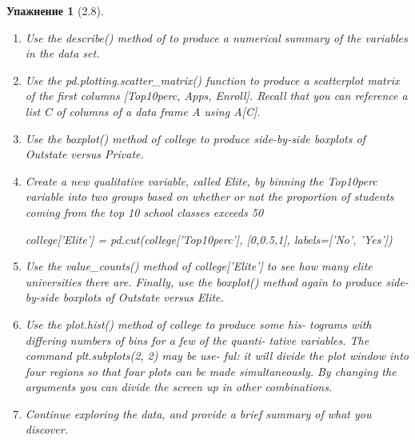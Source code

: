 \documentclass{article}
\newtheorem{exercise}[subsubsection]{Упажнение}
\begin{document}
\begin{exercise}[2.8]
\begin{enumerate}[label=(\alph*)]
		\item Use the describe() method of to produce a numerical summary
		of the variables in the data set.
		\item Use the pd.plotting.scatter\_matrix() function to produce a
		scatterplot matrix of the first columns [Top10perc, Apps, Enroll].
		Recall that you can reference a list C of columns of a data frame
		A using A[C].
		\item Use the boxplot() method of college to produce side-by-side
		boxplots of Outstate versus Private.
		\item Create a new qualitative variable, called Elite, by binning the
		Top10perc variable into two groups based on whether or not the
		proportion of students coming from the top 10%
		school classes exceeds 50%
		\begin{python}
college['Elite'] = pd.cut(college['Top10perc'],
[0,0.5,1],
labels=['No', 'Yes'])
		\end{python}
		\item Use the value\_counts() method of college['Elite'] to see how
		many elite universities there are. Finally, use the boxplot() method
		again to produce side-by-side boxplots of Outstate versus Elite.
		\item Use the plot.hist() method of college to produce some his-
		tograms with differing numbers of bins for a few of the quanti-
		tative variables. The command plt.subplots(2, 2) may be use-
		ful: it will divide the plot window into four regions so that four
		plots can be made simultaneously. By changing the arguments
		you can divide the screen up in other combinations.
		\item Continue exploring the data, and provide a brief summary of
		what you discover.		
	\end{enumerate}		
	\end{exercise}
\end{document}

